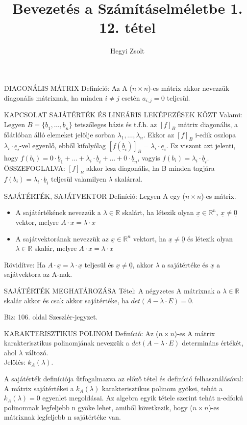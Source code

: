 \documentclass[]{article}
\title{Bevezetés a Számításelméletbe 1.\\{\large 12. tétel}}
\author{Hegyi Zsolt}
\newcommand{\R}{\mathbb{R}}
\newcommand{\Und}[1]{\underline{#1}}
\begin{document}
\maketitle{}
\begin{shaded}
DIAGONÁLIS MÁTRIX Definíció: Az A ($n \times n$)-es mátrix akkor nevezzük diagonális mátrixnak, ha minden $i \neq j$ esetén $a_{i,j} = 0$ teljesül.
\end{shaded}
\begin{framed}
KAPCSOLAT SAJÁTÉRTÉK ÉS LINEÁRIS LEKÉPEZÉSEK KÖZT Valami:
Legyen $B = \{\Und{b}_1, \ldots, \Und{b}_n\}$ tetszőleges bázis és t.f.h. az $[f]_B$ mátrix diagonális, a főátlóban álló elemeket jelölje sorban $\lambda_1, \ldots, \lambda_n$. Ekkor az $[f]_B$ i-edik oszlopa $\lambda_i\cdot\Und{e}_i$-vel egyenlő, ebből kifolyólag $[f(\Und{b}_i)]_B = \lambda_i \cdot \Und{e}_i$. Ez viszont azt jelenti, hogy $f(b_i) = 0\cdot\Und{b}_1 + \ldots + \lambda_i \cdot \Und{b}_i + \ldots + 0 \cdot\Und{b}_n$, vagyis $f(b_i) = \lambda_i \cdot \Und{b}_i$.\\
ÖSSZEFOGLALVA: $[f]_B$ akkor lesz diagonális, ha B minden tagjára $f(b_i) = \lambda_i \cdot \Und{b}_i$ teljesül valamilyen $\lambda$ skalárral.
\end{framed}
\begin{shaded}
SAJÁTÉRTÉK, SAJÁTVEKTOR Definíció: Legyen A egy ($n \times n$)-es mátrix.
\begin{itemize}
\item A sajátértékének nevezzük a $\lambda \in \R$ skalárt, ha létezik olyan $\Und{x} \in \R^n,\: \Und{x} \neq \Und{0}$ vektor, melyre $A \cdot \Und{x} = \lambda\cdot \Und{x}$
\item A sajátvektorának nevezzük az $\Und{x} \in \R^n$ vektort, ha $\Und{x} \neq \Und{0}$ és létezik olyan $\lambda \in \R$ skalár, melyre $A \cdot \Und{x} = \lambda\cdot \Und{x}$
\end{itemize}
Rövidítve: Ha $A\cdot\Und{x} = \lambda\cdot\Und{x}$ teljesül és $\Und{x} \neq \Und{0}$, akkor $\lambda$ a sajátértéke és $\Und{x}$ a sajátvektora az A-nak.
\end{shaded}
\begin{framed}
SAJÁTÉRTÉK MEGHATÁROZÁSA Tétel: A négyzetes A mátrixnak a $\lambda \in \R$ skalár akkor és csak akkor sajátértéke, ha $det(A - \lambda\cdot E) = 0$.
\end{framed}
\begin{leftbar}
Biz: 106. oldal Szeszlér-jegyzet.
\end{leftbar}
\begin{shaded}
KARAKTERISZTIKUS POLINOM Definíció: Az ($n \times n$)-es A mátrix karakterisztikus polinomjának nevezzük a $det(A - \lambda\cdot E)$ determináns értékét, ahol $\lambda$ változó.\\
Jelölés: $k_A(\lambda)$.
\end{shaded}
A sajátérték definíciója űtfogalmazva az előző tétel és definíció felhasználásával: A mátrix sajátértékei a $k_A(\lambda)$ karakterisztikus polinom gyökei, tehát a $k_A(\lambda) = 0$ egyenlet megoldásai. Az algebra egyik tétele szerint tehát n-edfokú polinomnak legfeljebb n gyöke lehet, amiből következik, hogy ($n \times n$)-es mátrixnak legfeljebb n sajátértéke van.
\end{document}
